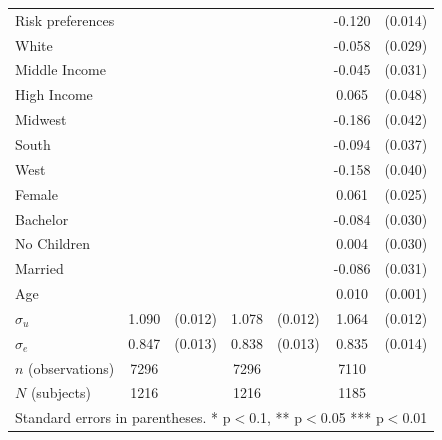 \documentclass[12pt]{article}
\begin{document}
\begin{table}[H]
{\begin{tabular}{l*{3}{cc}}
Risk preferences&                     &            &                     &            &      -0.120\sym{***}&     (0.014)\\
White       &                     &            &                     &            &      -0.058\sym{**} &     (0.029)\\
Middle Income&                     &            &                     &            &      -0.045         &     (0.031)\\
High Income &                     &            &                     &            &       0.065         &     (0.048)\\
Midwest     &                     &            &                     &            &      -0.186\sym{***}&     (0.042)\\
South       &                     &            &                     &            &      -0.094\sym{**} &     (0.037)\\
West        &                     &            &                     &            &      -0.158\sym{***}&     (0.040)\\
Female      &                     &            &                     &            &       0.061\sym{**} &     (0.025)\\
Bachelor    &                     &            &                     &            &      -0.084\sym{***}&     (0.030)\\
No Children &                     &            &                     &            &       0.004         &     (0.030)\\
Married     &                     &            &                     &            &      -0.086\sym{***}&     (0.031)\\
Age         &                     &            &                     &            &       0.010\sym{***}&     (0.001)\\
$\sigma_u$     &       1.090\sym{***}&     (0.012)&       1.078\sym{***}&     (0.012)&       1.064\sym{***}&     (0.012)\\
$\sigma_e $    &       0.847\sym{***}&     (0.013)&       0.838\sym{***}&     (0.013)&       0.835\sym{***}&     (0.014)\\

\hline
\(n\) (observations)      &        7296         &            &        7296         &            &        7110         &            \\
\hline
\(N\) (subjects)      &        1216          &            &         1216          &            &        1185         &            \\
\hline\hline
\multicolumn{7}{l}{\footnotesize Standard errors in parentheses. * p$<$0.1, ** p$<$0.05 *** p$<$0.01}\\
\end{tabular}
}



\end{table}
\end{document}
